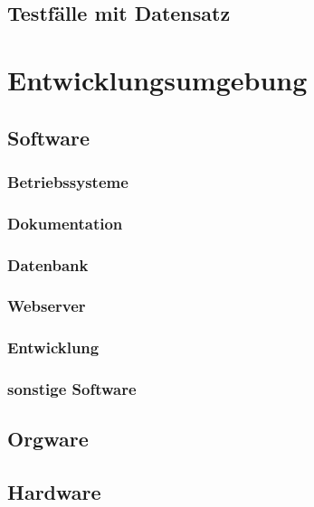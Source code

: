 \documentclass[a4paper]{scrreprt}
\begin{document}
\section{Testfälle mit Datensatz}






\chapter{Entwicklungsumgebung}
    \section{Software}
        \subsection{Betriebssysteme}
            
        \subsection{Dokumentation}
            
        \subsection{Datenbank}
           
        \subsection{Webserver}
            
        \subsection{Entwicklung}
           
        \subsection{sonstige Software}
           
    \section{Orgware}
       
    \section{Hardware}
        
\printglossaries
\end{document}
